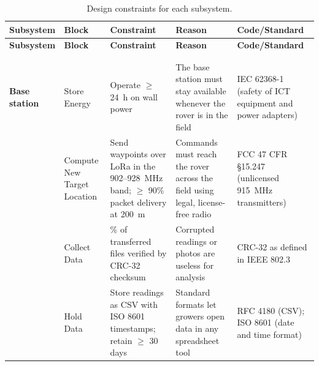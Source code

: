 \documentclass[12pt, letterpaper]{article}
\begin{document}
{\footnotesize
\setlength{\tabcolsep}{3pt}
\begin{longtable}{@{}>{\raggedright\arraybackslash}p{} >{\raggedright\arraybackslash}p{} >{\raggedright\arraybackslash}p{} >{\raggedright\arraybackslash}p{} >{\raggedright\arraybackslash}p{}@{}}
\toprule
\textbf{Subsystem} & \textbf{Block} & \textbf{Constraint} & \textbf{Reason} & \textbf{Code/Standard} \\
\midrule[0.8pt]
\endfirsthead

\toprule
\textbf{Subsystem} & \textbf{Block} & \textbf{Constraint} & \textbf{Reason} & \textbf{Code/Standard} \\
\midrule[0.8pt]
\endhead

\midrule
\multicolumn{5}{r}{\emph{Continued on next page}} \\
\endfoot

\bottomrule
\addlinespace[4pt]
\caption{Design constraints for each subsystem.}
\label{tab:design_constraints} \\
\endlastfoot

\textbf{Base station} & Store Energy & Operate $\geq$ 24~h on wall power & The base station must stay available whenever the rover is in the field & IEC 62368-1 (safety of ICT equipment and power adapters) \\
\cmidrule[0.2pt](l){2-5}
 & Compute New Target Location & Send waypoints over LoRa in the 902--928~MHz band; $\geq$ 90\% packet delivery at 200~m & Commands must reach the rover across the field using legal, license-free radio & FCC 47 CFR \S15.247 (unlicensed 915~MHz transmitters) \\
\cmidrule[0.2pt](l){2-5}
 & Collect Data & 100\% of transferred files verified by CRC-32 checksum & Corrupted readings or photos are useless for analysis & CRC-32 as defined in IEEE 802.3 \\
\cmidrule[0.2pt](l){2-5}
 & Hold Data & Store readings as CSV with ISO 8601 timestamps; retain $\geq$ 30 days & Standard formats let growers open data in any spreadsheet tool & RFC 4180 (CSV); ISO 8601 (date and time format) \\
\midrule


\end{longtable}}
\end{document}
